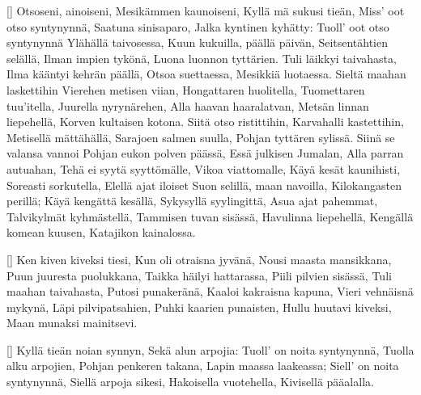 []
  \beginverse
    Otsoseni, ainoiseni,
    Mesikämmen kaunoiseni,
    Kyllä mä sukusi tieän,
    Miss' oot otso syntynynnä,
    Saatuna sinisaparo,
    Jalka kyntinen kyhätty:
    Tuoll' oot otso syntynynnä
    Ylähällä taivosessa,
    Kuun kukuilla, päällä päivän,
    Seitsentähtien selällä,
    Ilman impien tykönä,
    Luona luonnon tyttärien.
  \endverse
  \beginverse
    Tuli läikkyi taivahasta,
    Ilma kääntyi kehrän päällä,
    Otsoa suettaessa,
    Mesikkiä luotaessa.
    Sieltä maahan laskettihin
    Vierehen metisen viian,
    Hongattaren huolitella,
    Tuomettaren tuu'itella,
    Juurella nyrynärehen,
    Alla haavan haaralatvan,
    Metsän linnan liepehellä,
    Korven kultaisen kotona.
  \endverse
  \beginverse
    Siitä otso ristittihin,
    Karvahalli kastettihin,
    Metisellä mättähällä,
    Sarajoen salmen suulla,
    Pohjan tyttären sylissä.
    Siinä se valansa vannoi
    Pohjan eukon polven päässä,
    Essä julkisen Jumalan,
    Alla parran autuahan,
    Tehä ei syytä syyttömälle,
    Vikoa viattomalle,
    Käyä kesät kaunihisti,
    Soreasti sorkutella,
    Elellä ajat iloiset
    Suon selillä, maan navoilla,
    Kilokangasten perillä;
    Käyä kengättä kesällä,
    Sykysyllä syylingittä,
    Asua ajat pahemmat,
    Talvikylmät kyhmästellä,
    Tammisen tuvan sisässä,
    Havulinna liepehellä,
    Kengällä komean kuusen,
    Katajikon kainalossa.
  \endverse
\endsong


[]
  \beginverse
    Ken kiven kiveksi tiesi,
    Kun oli otraisna jyvänä,
    Nousi maasta mansikkana,
    Puun juuresta puolukkana,
    Taikka häilyi hattarassa,
    Piili pilvien sisässä,
    Tuli maahan taivahasta,
    Putosi punakeränä,
    Kaaloi kakraisna kapuna,
    Vieri vehnäisnä mykynä,
    Läpi pilvipatsahien,
    Puhki kaarien punaisten,
    Hullu huutavi kiveksi,
    Maan munaksi mainitsevi.
  \endverse
\endsong


[]
  \beginverse
    Kyllä tieän noian synnyn,
    Sekä alun arpojia:
    Tuoll' on noita syntynynnä,
    Tuolla alku arpojien,
    Pohjan penkeren takana,
    Lapin maassa laakeassa;
    Siell' on noita syntynynnä,
    Siellä arpoja sikesi,
    Hakoisella vuotehella,
    Kivisellä pääalalla.
  \endverse
\endsong


